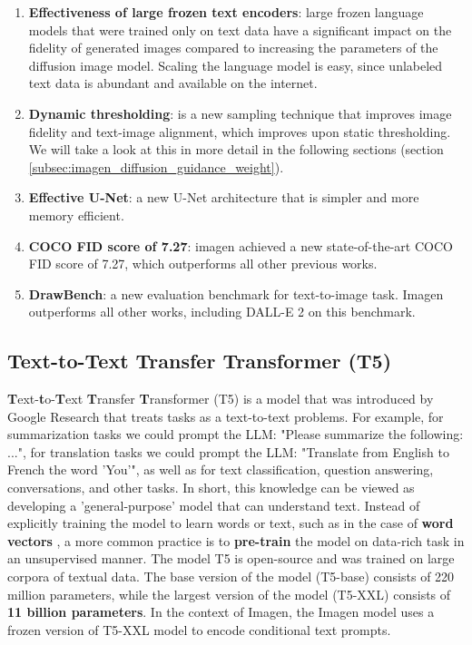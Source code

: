 \begin{enumerate}
    \item \textbf{Effectiveness of large frozen text encoders}: large frozen language models that were trained only on text data have a significant impact on the fidelity of generated images compared to increasing the parameters of the diffusion image model. Scaling the language model is easy, since unlabeled text data is abundant and available on the internet.
    \item \textbf{Dynamic thresholding}: is a new sampling technique that improves image fidelity and text-image alignment, which improves upon static thresholding. We will take a look at this in more detail in the following sections (section \ref{subsec:imagen_diffusion_guidance_weight}).
    \item \textbf{Effective U-Net}: a new U-Net architecture that is simpler and more memory efficient.
    \item \textbf{COCO FID score of 7.27}: imagen achieved a new state-of-the-art COCO FID score of 7.27, which outperforms all other previous works.
    \item \textbf{DrawBench}: a new evaluation benchmark for text-to-image task. Imagen outperforms all other works, including DALL-E 2 \cite{dalle_2} on this benchmark.
\end{enumerate}



















\subsection{Text-to-Text Transfer Transformer (T5)}
\label{subsec:t5}

\textbf{T}ext-\textbf{t}o-\textbf{T}ext \textbf{T}ransfer \textbf{T}ransformer (T5) \cite{t5_model} is a model that was introduced by Google Research that treats tasks as a text-to-text problems. For example, for summarization tasks we could prompt the LLM: "Please summarize the following: ...", for translation tasks we could prompt the LLM: "Translate from English to French the word 'You'", as well as for text classification, question answering, conversations, and other tasks. In short, this knowledge can be viewed as developing a 'general-purpose' model that can understand text.  Instead of explicitly training the model to learn words or text, such as in the case of \textbf{word vectors} \cite{cbow_word2vec}, a more common practice is to \textbf{pre-train} \cite{bert} the model on data-rich task in an unsupervised manner. The model T5 is open-source and was trained on large corpora of textual data. The base version of the model (T5-base) consists of 220 million parameters, while the largest version of the model (T5-XXL) consists of \textbf{11 billion parameters}. In the context of Imagen, the Imagen model uses a frozen version of T5-XXL model to encode conditional text prompts.

